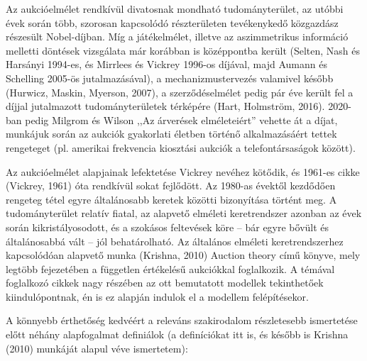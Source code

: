 \documentclass[twoside, magyar, showtrims]{corvinusphd}
\begin{document}
\scwords Az aukcióelmélet rendkívül divatosnak mondható tudományterület,
az utóbbi évek során több, szorosan kapcsolódó részterületen tevékenykedő
közgazdász részesült Nobel-díjban. Míg a játékelmélet, illetve az aszimmetrikus
információ melletti döntések vizsgálata már korábban is középpontba került
(Selten, Nash és Harsányi 1994-es, és Mirrlees és Vickrey 1996-os díjával,
majd Aumann és Schelling 2005-ös jutalmazásával), a mechanizmustervezés
valamivel később (Hurwicz, Maskin, Myerson, 2007), a szerződéselmélet
pedig pár éve került fel a díjjal jutalmazott tudományterületek térképére
(Hart, Holmström, 2016). 2020-ban pedig Milgrom és Wilson 
,,Az árverések elméleteiért'' vehette át a díjat, munkájuk során
az aukciók gyakorlati életben történő alkalmazásáért tettek rengeteget
(pl. amerikai frekvencia kiosztási aukciók a telefontársaságok között).

Az aukcióelmélet alapjainak lefektetése Vickrey nevéhez kötődik,
és 1961-es cikke (Vickrey, 1961) óta rendkívül sokat fejlődött.
Az 1980-as évektől kezdődően rengeteg tétel egyre általánosabb
keretek közötti bizonyítása történt meg. A tudományterület
relatív fiatal, az alapvető elméleti keretrendszer azonban az
évek során kikristályosodott, és a szokásos feltevések köre –
bár egyre bővült és általánosabbá vált – jól behatárolható.
Az általános elméleti keretrendszerhez kapcsolódóan alapvető
munka (Krishna, 2010) Auction theory című könyve,
mely legtöbb fejezetében a független értékelésű aukciókkal foglalkozik.
A témával foglalkozó cikkek nagy részében az ott bemutatott
modellek tekinthetőek kiindulópontnak, én is ez alapján indulok
el a modellem felépítésekor.

A könnyebb érthetőség kedvéért a releváns szakirodalom
részletesebb ismertetése előtt néhány alapfogalmat definiálok
(a definíciókat itt is, és később is Krishna (2010) munkáját alapul véve ismertetem):
\end{document}

